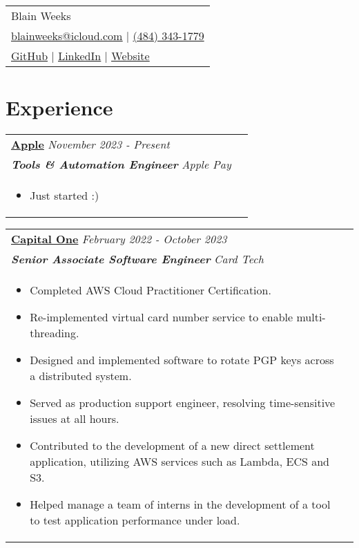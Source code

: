 \documentclass[10pt]{article}
\begin{document}
\pagestyle{empty}


\begin{tabularx}{\linewidth}{@{} C @{}}
\Huge{Blain Weeks}
\\
{\underline{\href{mailto:blainweeks@icloud.com}{\raisebox{-0.05\height}{\faEnvelope} blainweeks@icloud.com}} $|$}
{\href{tel:+14843431779}{\raisebox{-0.05\height}{\faMobile} (484) 343-1779}}
\\
{\underline{\href{https://github.com/bweeks42}{\raisebox{-0.05\height}{\faGithub} GitHub}} $|$}
{\underline{\href{https://www.linkedin.com/in/blain-weeks-aba724119}{\raisebox{-0.05\height}{\faLinkedin} LinkedIn}} $|$}
{\underline{\href{https://www.blainweeks.com}{\raisebox{-0.05\height}{\faLink} Website}}}
\end{tabularx}

\section{Experience}
\begin{tabularx}{\linewidth}{ @{}l r@{} }
\textbf{\uline{Apple}} \hfill \textit{November 2023 - Present}\\[4pt]
\textbf{\textit{Tools \& Automation Engineer}} \hfill \textit{Apple Pay} \\[5pt]
\begin{minipage}[t]{\linewidth}
\begin{itemize}[leftmargin=2em, nosep]%
\item Just started :)
\end{itemize}
\end{minipage}
\end{tabularx}

\begin{tabularx}{\linewidth}{ @{}l r@{} }
\textbf{\uline{Capital One}} \hfill \textit{February 2022 - October 2023}\\[4pt]
\textbf{\textit{Senior Associate Software Engineer}} \hfill \textit{Card Tech} \\[5pt]
\begin{minipage}[t]{\linewidth}
\begin{itemize}[leftmargin=2em, nosep, after=\strut, itemsep=2pt]
\item Completed AWS Cloud Practitioner Certification.
\item Re-implemented virtual card number service to enable multi-threading.
\item Designed and implemented software to rotate PGP keys across a distributed system.
\item Served as production support engineer, resolving time-sensitive issues at all hours.
\item Contributed to the development of a new direct settlement application, utilizing AWS services such as Lambda, ECS and S3.
\item Helped manage a team of interns in the development of a tool to test application performance under load.
\end{itemize}
\end{minipage}
\end{tabularx}
\end{document}
